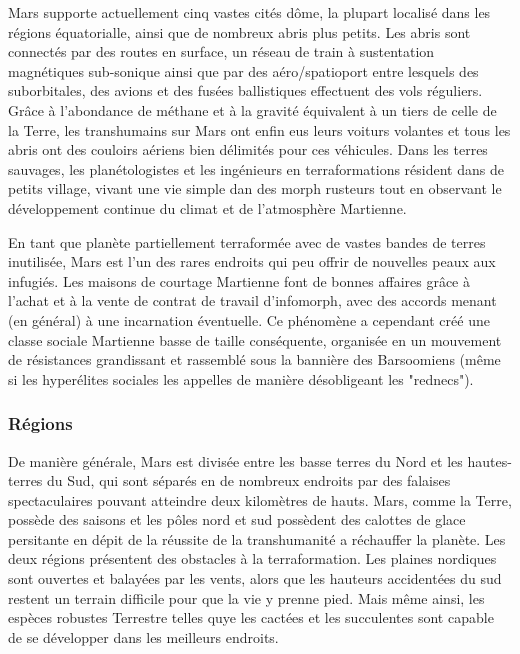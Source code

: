                                                             Mars supporte actuellement cinq vastes cités dôme, la plupart localisé dans les régions équatorialle, ainsi que de nombreux abris plus petits. Les abris sont connectés par des routes en surface, un réseau de train à sustentation magnétiques sub-sonique ainsi que par des aéro/spatioport entre lesquels des suborbitales, des avions et des fusées ballistiques effectuent des vols réguliers. Grâce à l'abondance de méthane et à la gravité équivalent à un tiers de celle de la Terre, les transhumains sur Mars ont enfin eus leurs voiturs volantes et tous les abris ont des couloirs aériens bien délimités pour ces véhicules. Dans les terres sauvages, les planétologistes et les ingénieurs en terraformations résident dans de petits village, vivant une vie simple dan des morph rusteurs tout en observant le développement continue du climat et de l'atmosphère Martienne. 

                                                            En tant que planète partiellement terraformée avec de vastes bandes de terres inutilisée, Mars est l'un des rares endroits qui peu offrir de nouvelles peaux aux infugiés. Les maisons de courtage Martienne font de bonnes affaires grâce à l'achat et à la vente de contrat de travail d'infomorph, avec des accords menant (en général) à une incarnation éventuelle. Ce phénomène a cependant créé une classe sociale Martienne basse de taille conséquente, organisée en un mouvement de résistances grandissant et rassemblé sous la bannière des Barsoomiens (même si les hyperélites sociales les appelles de manière désobligeant les "rednecs"). 

                                                            \subsubsection{Régions} \label{sec:regions} 

                                                            De manière générale, Mars est divisée entre les basse terres du Nord et les hautes-terres du Sud, qui sont séparés en de nombreux endroits par des falaises spectaculaires pouvant atteindre deux kilomètres de hauts. Mars, comme la Terre, possède des saisons et les pôles nord et sud possèdent des calottes de glace persitante en dépit de la réussite de la transhumanité a réchauffer la planète. Les deux régions présentent des obstacles à la terraformation. Les plaines nordiques sont ouvertes et balayées par les vents, alors que les hauteurs accidentées du sud restent un terrain difficile pour que la vie y prenne pied. Mais même ainsi, les espèces robustes Terrestre telles quye les cactées et les succulentes sont capable de se développer dans les meilleurs endroits. 

